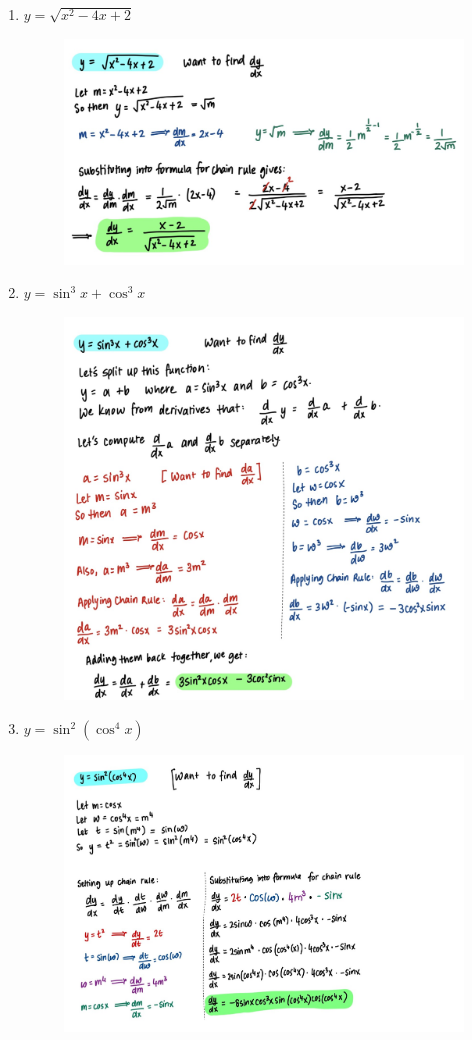 \documentclass{article}
\begin{document}
\begin{enumerate}
\begin{figure}[H]
        \label{fig:Q2}
    \end{figure}
    \item $y = \sqrt{x^2 -4x + 2}$
    \begin{figure}[H]
        \centering
        \includegraphics[width=0.7 \linewidth]{Q3.jpg}
        \label{fig:Q3}
    \end{figure}
    \item $y = \sin ^3 x + \cos^3 x$
    \begin{figure}[H]
        \centering
        \includegraphics[width=0.78 \linewidth]{Q4.jpg}
        \label{fig:Q4}
    \end{figure}
    \item $y = \sin^2\left(\cos^4 x\right)$
    \begin{figure}[H]
        \centering
        \includegraphics[width= \linewidth]{Q5.jpg}

\end{figure}
\end{enumerate}
\end{document}
